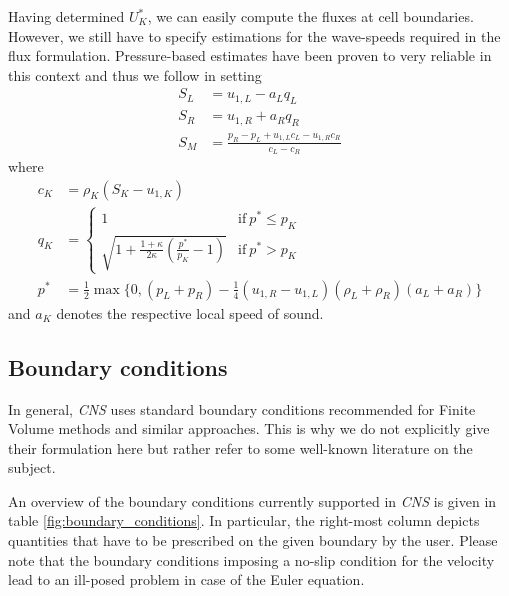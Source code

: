 Having determined $U_K^*$, we can easily compute the fluxes at cell boundaries. 
However, we still have to specify estimations for the wave-speeds required in the 
flux formulation. Pressure-based estimates have been proven to very reliable in this
context and thus we follow \cite{ToroSpruceSpeares1994} in setting \cite{ToroSpruceSpeares1994}
\begin{align}
	S_L &= u_{1,L} - a_L q_L\\
	S_R &= u_{1,R} + a_R q_R\\
	S_M &= \frac{p_R - p_L + u_{1,L} c_L - u_{1,R} c_R}{c_L - c_R}
\end{align}
where
\begin{align}
	c_K &= \rho_K (S_K - u_{1,K})\\
	q_K &= \begin{cases}
		1
			& \mathrm{if~} p^* \leq p_K\\
		\sqrt{1 + \frac{1 + \kappa}{2 \kappa} (\frac{p^*}{p_K} - 1)}
			& \mathrm{if~} p^* > p_K
	\end{cases}\\
	p^* &= \frac{1}{2} \max \{0, (p_L + p_R) - \frac{1}{4} (u_{1,R} - u_{1,L}) (\rho_L + \rho_R) (a_L + a_R)\}
\end{align}
and $a_K$ denotes the respective local speed of sound.


\subsection{Boundary conditions}
\label{sec:numerics_bcs}

In general, \emph{CNS} uses standard boundary conditions recommended for Finite 
Volume methods and similar approaches. This is why we do not explicitly give their 
formulation here but rather refer to some well-known literature on the subject.

An overview of the boundary conditions currently supported in \emph{CNS} is given
in table \ref{fig:boundary_conditions}. In particular, the right-most column depicts
quantities that have to be prescribed on the given boundary by the user. Please note
that the boundary conditions imposing a no-slip condition for the velocity lead to
an ill-posed problem in case of the Euler equation.

